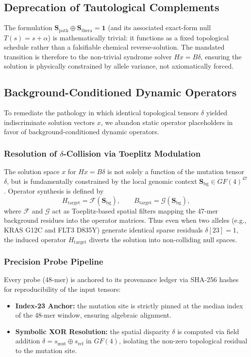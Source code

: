 \subsection{Deprecation of Tautological Complements}
The formulation \(\mathbf{S}_{\mathrm{path}}\oplus\mathbf{S}_{\mathrm{thera}}=\mathbf{1}\)
(and its associated exact-form null \(T(s)=s+\alpha\)) is mathematically
trivial: it functions as a fixed topological schedule rather than a
falsifiable chemical reverse-solution. The mandated transition is therefore to
the non-trivial syndrome solver \(Hx=B\delta\), ensuring the solution is
physically constrained by allele variance, not axiomatically forced.

\subsection{Background-Conditioned Dynamic Operators}
To remediate the pathology in which identical topological tensors \(\delta\)
yielded indiscriminate solution vectors \(x\), we abandon static operator
placeholders in favor of background-conditioned dynamic operators.

\subsubsection{Resolution of \(\delta\)-Collision via Toeplitz Modulation}
The solution space \(x\) for \(Hx=B\delta\) is not solely a function of the
mutation tensor \(\delta\), but is fundamentally constrained by the local
genomic context \(\mathbf{S}_{\mathrm{bg}}\in GF(4)^{47}\). Operator synthesis
is defined by
\begin{equation}
    H_{\mathrm{target}} = \mathcal{F}(\mathbf{S}_{\mathrm{bg}}),\qquad
    B_{\mathrm{target}} = \mathcal{G}(\mathbf{S}_{\mathrm{bg}}),
\end{equation}
where \(\mathcal{F}\) and \(\mathcal{G}\) act as Toeplitz-based spatial filters
mapping the 47-mer background residues into the operator matrices. Thus even
when two alleles (e.g., KRAS G12C and FLT3 D835Y) generate identical sparse
residuals \(\delta[23]=1\), the induced operator \(H_{\mathrm{target}}\)
diverts the solution into non-colliding null spaces.

\subsubsection{Precision Probe Pipeline}
Every probe (48-mer) is anchored to its provenance ledger via SHA-256 hashes
for reproducibility of the input tensors:
\begin{itemize}
    \item \textbf{Index-23 Anchor:} the mutation site is strictly pinned at the
    median index of the 48-mer window, ensuring algebraic alignment.
    \item \textbf{Symbolic XOR Resolution:} the spatial disparity \(\delta\) is
    computed via field addition \(\delta=s_{\mathrm{mut}}\oplus s_{\mathrm{ref}}\)
    in \(GF(4)\), isolating the non-zero topological residual to the mutation
    site.
\end{itemize}

